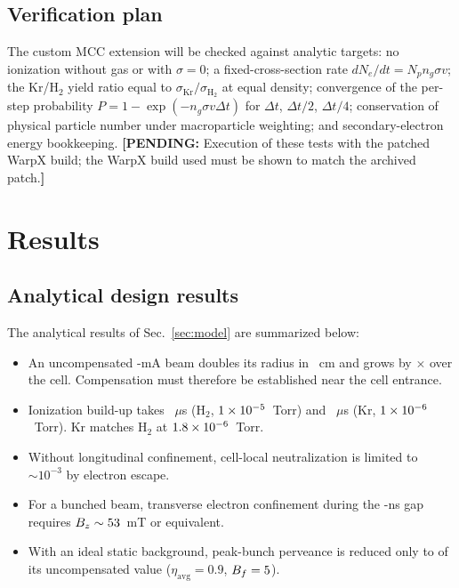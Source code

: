 \documentclass[aps,prab,10pt,twocolumn,superscriptaddress,showpacs,floatfix]{revtex4-2}
\newcommand{\pending}[1]{\textcolor{red!70!black}{\textbf{[PENDING:} #1\textbf{]}}}
\newcommand{\etaavg}{\eta_{\mathrm{avg}}}
\newcommand{\Htwo}{\mathrm{H}_2}
\begin{document}
\subsection{Verification plan}
\label{sec:verification}

The custom MCC extension will be checked against analytic targets: no ionization
without gas or with $\sigma=0$; a fixed-cross-section rate $dN_e/dt=N_pn_g\sigma v$;
the Kr/$\Htwo$ yield ratio equal to $\sigma_{\mathrm{Kr}}/\sigma_{\Htwo}$ at equal
density; convergence of the per-step probability $P=1-\exp(-n_g\sigma v\Delta t)$ for
$\Delta t$, $\Delta t/2$, $\Delta t/4$; conservation of physical particle number under
macroparticle weighting; and secondary-electron energy bookkeeping.
\pending{Execution of these tests with the patched WarpX build; the WarpX build used
must be shown to match the archived patch.}

\section{Results}
\label{sec:results}

\subsection{Analytical design results}

The analytical results of Sec.~\ref{sec:model} are summarized below:
\begin{itemize}
\item An uncompensated \numIavgma-mA beam doubles its radius in \numzdoublecm~cm and
grows by \numgrowthKzero$\times$ over the cell. Compensation must therefore be
established near the cell entrance.
\item Ionization build-up takes \numtauHtwous~$\mu$s ($\Htwo$, $1\times10^{-5}$~Torr) and
\numtauKrus~$\mu$s (Kr, $1\times10^{-6}$~Torr). Kr matches $\Htwo$ at $1.8\times10^{-6}$~Torr.
\item Without longitudinal confinement, cell-local neutralization is limited to
$\sim10^{-3}$ by electron escape.
\item For a bunched beam, transverse electron confinement during the \numgapns-ns gap
requires $B_z\sim53$~mT or equivalent.
\item With an ideal static background, peak-bunch perveance is reduced only to
\numKeffpeakstatic{} of its uncompensated value ($\etaavg=0.9$, $B_f=5$).
\end{itemize}
\end{document}
